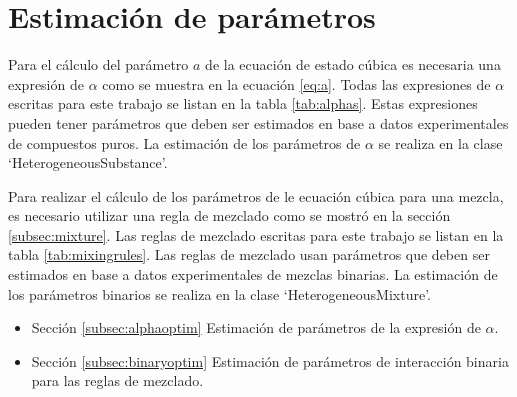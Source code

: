 \section{Estimación de parámetros}\label{sec:optimization}

	Para el cálculo del parámetro $a$ de la ecuación de estado cúbica es necesaria una expresión de $\alpha$ como se muestra en la ecuación \ref{eq:a}. Todas las expresiones de $\alpha$ escritas para este trabajo se listan en la tabla \ref{tab:alphas}. Estas expresiones pueden tener parámetros que deben ser estimados en base a datos experimentales de compuestos puros. La estimación de los parámetros de $\alpha$ se realiza en la clase `HeterogeneousSubstance'.

	Para realizar el cálculo de los parámetros de le ecuación cúbica para una mezcla, es necesario utilizar una regla de mezclado como se mostró en la sección \ref{subsec:mixture}. Las reglas de mezclado escritas para este trabajo se listan en la tabla \ref{tab:mixingrules}. Las reglas de mezclado usan parámetros que deben ser estimados en base a datos experimentales de mezclas binarias. La estimación de los parámetros binarios se realiza en la clase `HeterogeneousMixture'.

	\begin{itemize}
		\item{Sección} \ref{subsec:alphaoptim} Estimación de parámetros de la expresión de $\alpha$.
		\item{Sección} \ref{subsec:binaryoptim} Estimación de parámetros de interacción binaria para las reglas de mezclado.
	\end{itemize}

	





